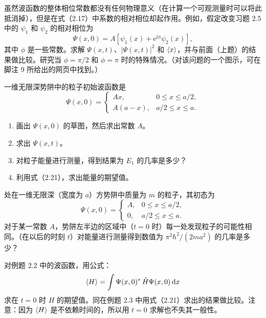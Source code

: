 虽然波函数的整体相位常数都没有任何物理意义（在计算一个可观测量时可以将此抵消掉），但是在式（2.17）中系数的相对相位却起作用。例如，假定改变习题 2.5 中的 $\psi_1$ 和 $\psi_2$ 的相对相位为
\[
\Psi(x,0)=A[\psi_1(x)+\mathrm{e}^{\mathrm{i}\phi}\psi_2(x)],
\]
其中 $\phi$ 是一些常数。求解 $\Psi(x,t)$、$|\Psi(x,t)|^2$ 和 $\left\langle x\right\rangle$，并与前面（上题）的结果做比较。研究当 $\phi=\pi/2$ 和 $\phi=\pi$ 时的特殊情况。（对该问题的一个图示，可在脚注 9 所给出的网页中找到。）
\vfill

一维无限深势阱中的粒子初始波函数是
\[
\Psi(x,0)=\begin{cases}
Ax,&0\leq x\leq a/2,\\
A(a-x),&a/2\leq x\leq a.
\end{cases}
\]
\begin{enumerate}
\item 画出 $\Psi(x,0)$ 的草图，然后求出常数 $A$。
\item 求出 $\Psi(x,t)$。
\item 对粒子能量进行测量，得到结果为 $E_1$ 的几率是多少？
\item 利用式（2.21），求出能量的期望值。
\end{enumerate}
\vfill

处在一维无限深（宽度为 $a$）方势阱中质量为 $m$ 的粒子，其初态为
\[
\Psi(x,0)=\begin{cases}
A,&0\leq x\leq a/2,\\
0,&a/2\leq x\leq a.
\end{cases}
\]
对于某一常数 $A$，势阱左半边的区域中（$t=0$ 时）每一处发现粒子的可能性相同。（在以后的时刻 $t$）对能量进行测量得到数值为 $\pi^2\hbar^2/(2ma^2)$ 的几率是多少？
\vfill

对例题 2.2 中的波函数，用公式：
\[
\left\langle H\right\rangle=\int\Psi(x,0)^*\,\hat H\Psi(x,0)\,\mathrm{d} x
\]
求在 $t=0$ 时 $H$ 的期望值。同在例题 2.3 中用式（2.21）求出的结果做比较。注意：因为 $\left\langle H\right\rangle$ 是不依赖时间的，所以用 $t=0$ 求解也不失其一般性。
\vfill

